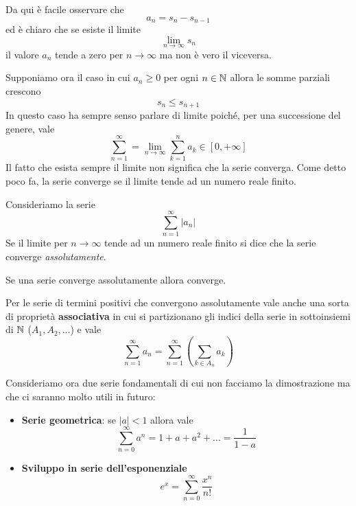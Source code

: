 \begin{observation}
	Da qui è facile osservare che
	\[ a_n = s_n - s_{n-1} \]
	ed è chiaro che se esiste il limite
	\[ \lim_{n \to \infty} s_n \]
	il valore $a_n$ tende a zero per $n \to \infty$ ma non è vero il viceversa.
\end{observation}

Supponiamo ora il caso in cui $a_n \geq 0$ per ogni $n \in \mathbb{N}$ allora le somme parziali crescono
\[ s_n \leq s_{n+1} \]
In questo caso ha sempre senso parlare di limite poiché, per una successione del genere, vale
\[ \sum_{n=1}^\infty = \lim_{n \to \infty} \sum_{k=1}^n a_k \in [0, +\infty]  \]
Il fatto che esista sempre il limite non significa che la serie converga. Come detto poco fa, la serie
converge se il limite tende ad un numero reale finito.

\begin{definition}
	Consideriamo la serie
	\[ \sum_{n=1}^\infty |a_n| \]
	Se il limite per $n \to \infty$ tende ad un numero reale finito si dice che la serie converge
	\emph{assolutamente}.
\end{definition}

\begin{theorem}
	Se una serie converge assolutamente allora converge.
\end{theorem}

Per le serie di termini positivi che convergono assolutamente vale anche una sorta di proprietà
\textbf{associativa} in cui si partizionano gli indici della serie in sottoinsiemi di $\mathbb{N}$
($A_1, A_2, \dots$) e vale
\[ \sum_{n=1}^\infty a_n = \sum_{n=1}^\infty \left( \sum_{k \in A_n} a_k \right) \]

Consideriamo ora due serie fondamentali di cui non facciamo la dimostrazione ma che ci saranno molto
utili in futuro:
\begin{itemize}
	\item \textbf{Serie geometrica}: se $|a| < 1$ allora vale
	      \[ \sum_{n=0}^\infty a^n = 1 + a + a^2 + \dots = \frac{1}{1 - a} \]
	\item \textbf{Sviluppo in serie dell'esponenziale}
	      \[ e^x = \sum_{n=0}^\infty \frac{x^n}{n!} \]
\end{itemize}
